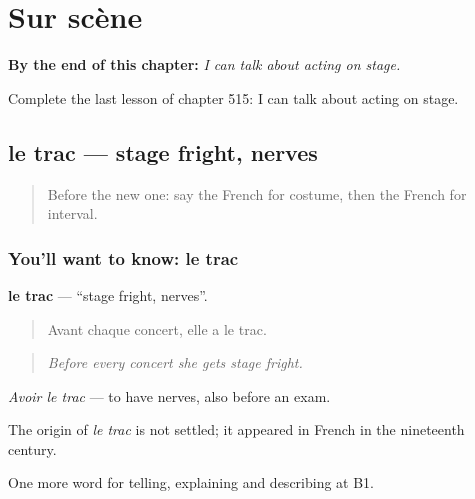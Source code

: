 
\chapter{Sur scène}
\label{ch:fr-sur-scene}

\begin{chapteropening}
\textbf{By the end of this chapter:} \emph{I can talk about acting on stage.}

Complete the last lesson of chapter 515: I can talk about acting on stage.
\end{chapteropening}

\section[le trac]{le trac — stage fright, nerves}

\label{lesson:FR-C515-trac}



\begin{quote}
Before the new one: say the French for costume, then the French for interval.
\end{quote}

\subsection*{You'll want to know: le trac}
\textbf{le trac} — \textquotedblleft{}stage fright, nerves\textquotedblright{}.

\begin{quote}
Avant chaque concert, elle a le trac.
\end{quote}

\begin{quote}
\emph{Before every concert she gets stage fright.}
\end{quote}

\emph{Avoir le trac} — to have nerves, also before an exam.

\begin{cousinweb}
The origin of \emph{le trac} is not settled; it appeared in French in the nineteenth century.
\end{cousinweb}

\begin{grammarlens}[title={What you've built}]
One more word for telling, explaining and describing at B1.
\end{grammarlens}

